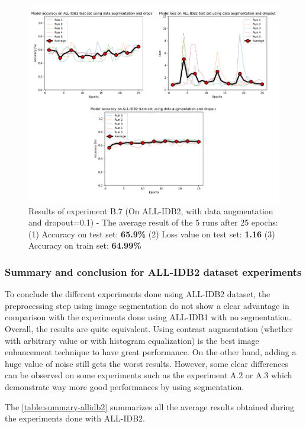 \documentclass[11pt, openany]{report}
\theoremstyle{plain}
\theoremstyle{definition}
\theoremstyle{remark}
\begin{document}
\begin{figure}[H]
  \centering
  \includegraphics[scale=0.5]{Code/ch6-LeukemiaSubtypes/figures_result/ALL_IDB2/all_idb2-data_aug_dropout.PNG}
  \caption{Results of experiment B.7 (On ALL-IDB2, with data augmentation and dropout=0.1) - The average result of the 5 runs after 25 epochs: (1) Accuracy on test set: \textbf{65.9\%} (2) Loss value on test set: \textbf{1.16} (3) Accuracy on train set: \textbf{64.99\%}}
  \label{fig:results-B7}
\end{figure}

\subsubsection{Summary and conclusion for ALL-IDB2 dataset experiments}
To conclude the different experiments done using ALL-IDB2 dataset, the preprocessing step using image segmentation do not show a clear advantage in comparison with the experiments done using ALL-IDB1 with no segmentation. Overall, the results are quite equivalent. Using contrast augmentation (whether with arbitrary value or with histogram equalization) is the best image enhancement technique to have great performance. On the other hand, adding a huge value of noise still gets the worst results. However, some clear differences can be observed on some experiments such as the experiment A.2 or A.3 which demonstrate way more good performances by using segmentation.  

The \autoref{table:summary-allidb2} summarizes all the average results obtained during the experiments done with ALL-IDB2. 
\end{document}
